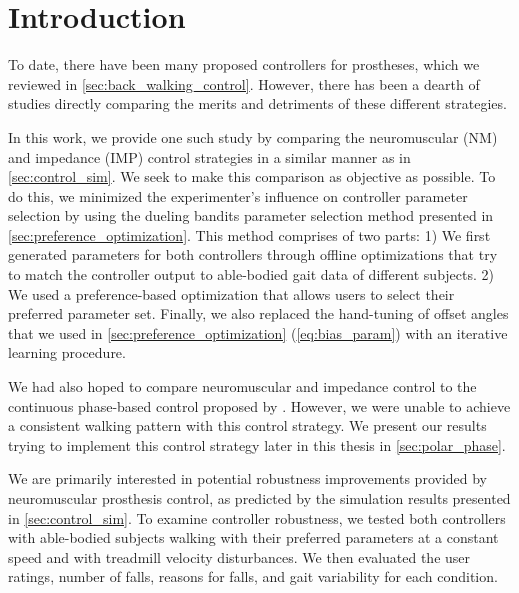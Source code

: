 \section{Introduction}

To date, there have been many proposed controllers for prostheses, which we
reviewed in \cref{sec:back_walking_control}. However, there has been a dearth of
studies directly comparing the merits and detriments of these different
strategies. 

In this work, we provide one such study by comparing the neuromuscular (NM) and
impedance (IMP) control strategies in a similar manner as in
\cref{sec:control_sim}.  We seek to make this comparison as objective as
possible. To do this, we minimized the experimenter's influence on controller
parameter selection by using the dueling bandits parameter selection method
presented in \cref{sec:preference_optimization}. This method comprises of two
parts: 1) We first generated parameters for both controllers through offline
optimizations that try to match the controller output to able-bodied gait data
of different subjects. 2) We used a preference-based optimization that allows
users to select their preferred parameter set. Finally, we also replaced the
hand-tuning of offset angles that we used in \cref{sec:preference_optimization}
(\cref{eq:bias_param}) with an iterative learning procedure.

We had also hoped to compare neuromuscular and impedance control to the
continuous phase-based control proposed by \citet{quintero2016preliminary}.
However, we were unable to achieve a consistent walking pattern with this
control strategy. We present our results trying to implement this control
strategy later in this thesis in \cref{sec:polar_phase}.

We are primarily interested in potential robustness improvements provided by
neuromuscular prosthesis control, as predicted by the simulation results
presented in \cref{sec:control_sim}. To examine controller robustness, we tested
both controllers with able-bodied subjects walking with their preferred
parameters at a constant speed and with treadmill velocity disturbances. We then
evaluated the user ratings, number of falls, reasons for falls, and gait
variability for each condition. 

